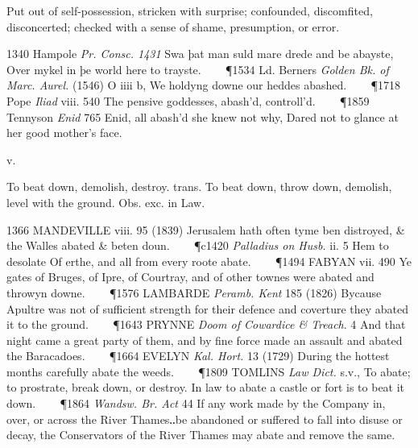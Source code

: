 \begin{description}[wide, labelwidth=!, labelindent=0pt]
\noindent
Put out of self-possession, stricken with surprise; confounded, discomfited,
disconcerted; checked with a sense of shame, presumption, or error. 

1340 Hampole \textit{Pr. Consc. 1431} Swa þat man suld mare drede and be 
abayste, Over mykel in þe world here to trayste.    
\P 1534 Ld. Berners \textit{Golden Bk. of Marc. Aurel.} (1546) O iiii b, We 
holdyng downe our heddes abashed.    
\P 1718 Pope \textit{Iliad} viii. 540 The pensive goddesses, abash'd, controll'd.    
\P 1859 Tennyson \textit{Enid} 765 Enid, all abash'd she knew not why, Dared not to 
glance at her good mother's face.


 v.  


\noindent {}

\vspace{-0.3cm}

\begin{myenumerate}
 To beat down, demolish, destroy. 
 trans. To beat down, throw down, demolish, level with the 
ground. Obs. exc. in Law. 

1366 MANDEVILLE viii. 95 (1839) Jerusalem hath often tyme ben distroyed, 
\& the Walles abated \& beten doun.    
\P c1420 \textit{Palladius on Husb.} ii. 5 Hem to desolate Of erthe, and 
all from every roote abate.    
\P 1494 FABYAN vii. 490 Ye gates of Bruges, of Ipre, of Courtray, and of 
other townes were abated and throwyn downe.    
\P 1576 LAMBARDE \textit{Peramb. Kent} 185 (1826) Bycause Apultre was not 
of sufficient strength for their defence and coverture they abated it to 
the ground.    
\P 1643 PRYNNE \textit{Doom of Cowardice \& Treach}. 4 And that night came 
a great party of them, and by fine force made an assault and abated the 
Baracadoes.    
\P 1664 EVELYN \textit{Kal. Hort.} 13 (1729) During the hottest months 
carefully abate the weeds.    
\P 1809 TOMLINS \textit{Law Dict.} s.v., To abate; to prostrate, break 
down, or destroy. In law to abate a castle or fort is to beat it down.    
\P 1864 \textit{Wandsw. Br. Act} 44 If any work made by the Company in, 
over, or across the River Thames‥be abandoned or suffered to fall into disuse 
or decay, the Conservators of the River Thames may abate and remove the same.


\end{myenumerate}
\end{description}
